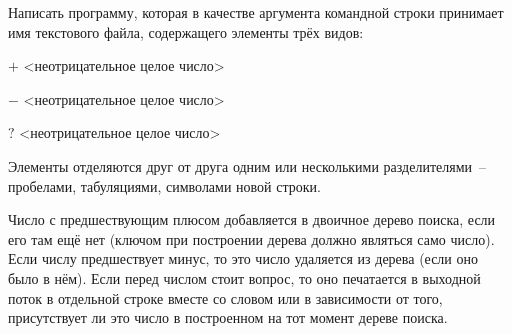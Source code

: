 

Написать программу, которая в качестве аргумента командной строки
принимает имя текстового файла, содержащего элементы трёх видов:

\begin{description}
\item{$+$} <неотрицательное целое число>
\item{$-$} <неотрицательное целое число>
\item{$?$} <неотрицательное целое число>
\end{description}

Элементы отделяются друг от друга одним или несколькими
разделителями~-- пробелами, табуляциями, символами новой строки.

Число
с предшествующим плюсом добавляется в двоичное дерево поиска, если
его там ещё нет (ключом при построении дерева должно являться само
число). Если числу предшествует минус, то это число удаляется из дерева
(если оно было в нём). Если перед числом стоит вопрос, то оно печатается
в выходной поток в отдельной строке вместе со словом  или  в
зависимости от того, присутствует ли это число в построенном на тот
момент дереве поиска.

